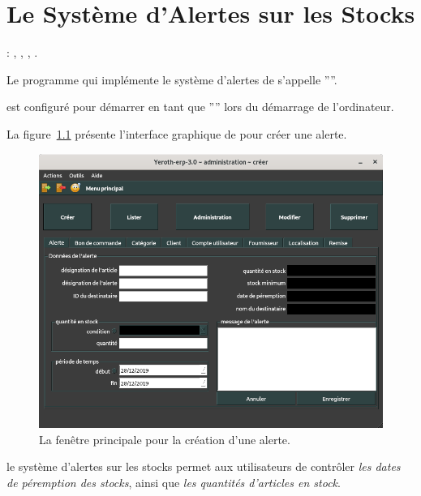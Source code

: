\chapter{Le Syst\`eme d'Alertes sur les Stocks}\label{chap:systeme-dalertes}

\utilisateurs: \lienadmin, \liencaissier, \lienmagasinier, \lienmanager.\\



Le programme qui impl\'emente le syst\`eme d'alertes
de \yeroth s'appelle ''''.

\yerothalert est configur\'e pour d\'emarrer en tant que
'''' lors du
d\'emarrage de l'ordinateur.

La figure~\ref{fig:yeren-fenetre-creer-alerte}
pr\'esente l'interface graphique de \yeroth pour
cr\'eer une alerte.

\begin{figure}[!htbp]
	\centering
	\includegraphics[scale=0.63]{images/yeren-fenetre-creer-alerte.png}
	\caption{La fen\^etre principale pour la cr\'eation d'une alerte.}
	\label{fig:yeren-fenetre-creer-alerte}
\end{figure}

le syst\`eme d'alertes sur les stocks permet aux
utilisateurs de contr\^oler \emph{les dates de
p\'eremption des stocks},
ainsi que \emph{les quantit\'es d'articles en stock}.

